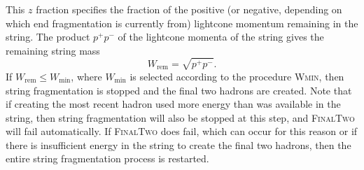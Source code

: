 \documentclass[12pt,a4paper]{report}
\begin{document}
This $z$ fraction specifies the fraction of the positive (or negative, depending on which end fragmentation is currently from) lightcone momentum remaining in the string. The product $p^+ p^-$ of the lightcone momenta of the string gives the remaining string mass
\begin{equation}
  W_\text{rem} = \sqrt{p^+ p^-}.
\end{equation}
If $W_\text{rem} \leq W_\text{min}$, where $W_\text{min}$ is selected according to the procedure \textsc{Wmin}, then string fragmentation is stopped and the final two hadrons are created. Note that if creating the most recent hadron used more energy than was available in the string, then string fragmentation will also be stopped at this step, and \textsc{FinalTwo} will fail automatically. If \textsc{FinalTwo} does fail, which can occur for this reason or if there is insufficient energy in the string to create the final two hadrons, then the entire string fragmentation process is restarted.
\end{document}
